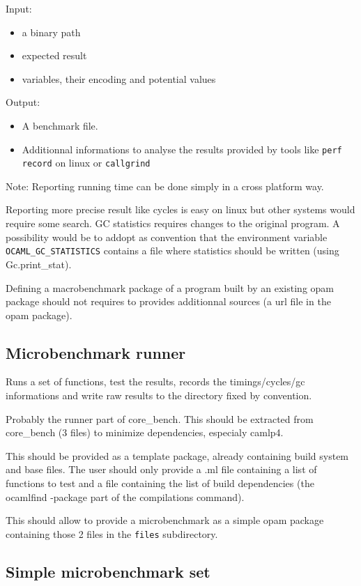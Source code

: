 \documentclass[11pt,a4paper]{article}
\begin{document}
Input:
\begin{itemize}
\item a binary path
\item expected result
\item variables, their encoding and potential values
\end{itemize}

Output:
\begin{itemize}
\item A benchmark file.
\item Additionnal informations to analyse the results provided by
  tools like \texttt{perf record} on linux or \texttt{callgrind}
\end{itemize}

Note: Reporting running time can be done simply in a cross platform
way.

Reporting more precise result like cycles is easy on linux but
other systems would require some search. GC statistics requires
changes to the original program. A possibility would be to addopt as
convention that the environment variable
\texttt{OCAML\_GC\_STATISTICS} contains a file where statistics should
be written (using Gc.print\_stat).

Defining a macrobenchmark package of a program built by an existing
opam package should not requires to provides additionnal sources (a
url file in the opam package).

\subsection{Microbenchmark runner}

Runs a set of functions, test the results, records the
timings/cycles/gc informations and write raw results to the directory
fixed by convention.

Probably the runner part of core\_bench. This should be extracted from
core\_bench (3 files) to minimize dependencies, especialy camlp4.

This should be provided as a template package, already containing
build system and base files. The user should only provide a .ml file
containing a list of functions to test and a file containing the list
of build dependencies (the ocamlfind -package part of the compilations
command).

This should allow to provide a microbenchmark as a simple opam package
containing those 2 files in the \texttt{files} subdirectory.

\subsection{Simple microbenchmark set}
\end{document}
